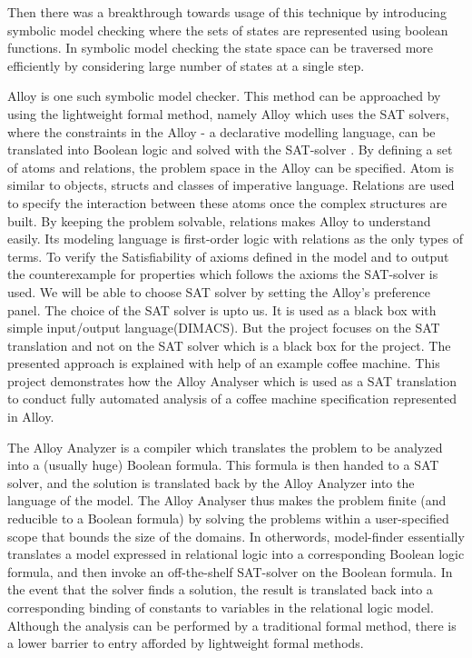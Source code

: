 \documentclass[a4paper,12pt]{report}
\begin{document}
Then there was a breakthrough towards usage of this technique by introducing symbolic model checking where the sets of states are represented using boolean functions. In symbolic model checking the state space can be traversed more  efficiently by considering large number of states at a single step.
   
Alloy is one such symbolic model checker. This method can be approached by using the lightweight formal method, namely Alloy which uses the SAT solvers, where the constraints in the Alloy - a declarative modelling language, can be translated into Boolean logic and solved with the SAT-solver \cite{Yeung2005}. By defining a set of atoms and relations, the problem space in the Alloy can be specified. Atom is similar to objects, structs and classes of imperative language. Relations are used to specify the interaction between these atoms once the complex structures are built. By keeping the problem solvable, relations makes Alloy to understand easily. Its modeling language is first-order logic with relations as the only types of terms. To verify the Satisfiability of axioms defined in the model and to output the counterexample for properties which follows the axioms the SAT-solver is used. We will be able to choose SAT solver by setting the Alloy's preference panel. The choice of the SAT solver is upto us. It is used as a black box with simple input/output language(DIMACS). But the project focuses on the SAT translation and not on the  SAT solver which is a black box for the project. The presented approach is explained with help of an example coffee machine. This project demonstrates how the Alloy Analyser which is used as a SAT translation to conduct fully automated analysis of a coffee machine specification represented in Alloy. 

The Alloy Analyzer is a compiler which translates the problem to be analyzed into a (usually huge) Boolean formula. This formula is then handed to a SAT solver, and the solution is translated back by the Alloy Analyzer into the language of the model. The Alloy Analyser thus makes the problem finite (and reducible to a Boolean formula) by solving the problems within a user-specified scope that bounds the size of the domains. In otherwords, model-finder essentially translates a model expressed in relational logic into a corresponding Boolean logic formula, and then invoke an off-the-shelf SAT-solver on the Boolean formula. In the event that the solver finds a solution, the result is translated back into a corresponding binding of constants to variables in the relational logic model. Although the analysis can be performed by a traditional formal method, there is a lower barrier to entry afforded by lightweight formal methods.
\end{document}
